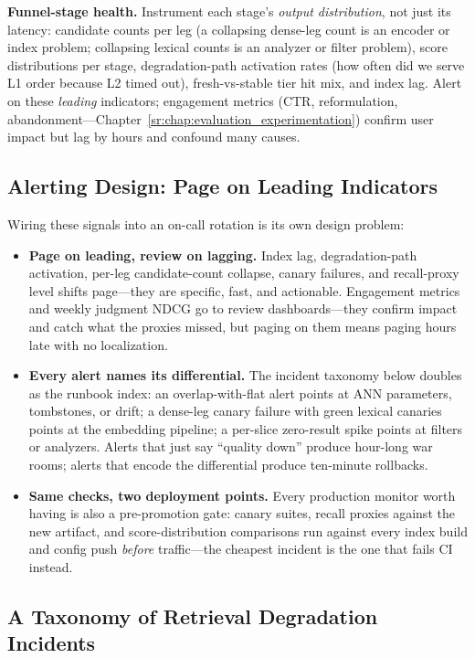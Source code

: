 \textbf{Funnel-stage health.} Instrument each stage's \textit{output distribution}, not just its latency: candidate counts per leg (a collapsing dense-leg count is an encoder or index problem; collapsing lexical counts is an analyzer or filter problem), score distributions per stage, degradation-path activation rates (how often did we serve L1 order because L2 timed out), fresh-vs-stable tier hit mix, and index lag. Alert on these \textit{leading} indicators; engagement metrics (CTR, reformulation, abandonment---Chapter~\ref{sr:chap:evaluation_experimentation}) confirm user impact but lag by hours and confound many causes.

\subsection{Alerting Design: Page on Leading Indicators}

Wiring these signals into an on-call rotation is its own design problem:

\begin{itemize}
    \item \textbf{Page on leading, review on lagging.} Index lag, degradation-path activation, per-leg candidate-count collapse, canary failures, and recall-proxy level shifts page---they are specific, fast, and actionable. Engagement metrics and weekly judgment NDCG go to review dashboards---they confirm impact and catch what the proxies missed, but paging on them means paging hours late with no localization.
    \item \textbf{Every alert names its differential.} The incident taxonomy below doubles as the runbook index: an overlap-with-flat alert points at ANN parameters, tombstones, or drift; a dense-leg canary failure with green lexical canaries points at the embedding pipeline; a per-slice zero-result spike points at filters or analyzers. Alerts that just say ``quality down'' produce hour-long war rooms; alerts that encode the differential produce ten-minute rollbacks.
    \item \textbf{Same checks, two deployment points.} Every production monitor worth having is also a pre-promotion gate: canary suites, recall proxies against the new artifact, and score-distribution comparisons run against every index build and config push \textit{before} traffic---the cheapest incident is the one that fails CI instead.
\end{itemize}

\subsection{A Taxonomy of Retrieval Degradation Incidents}

